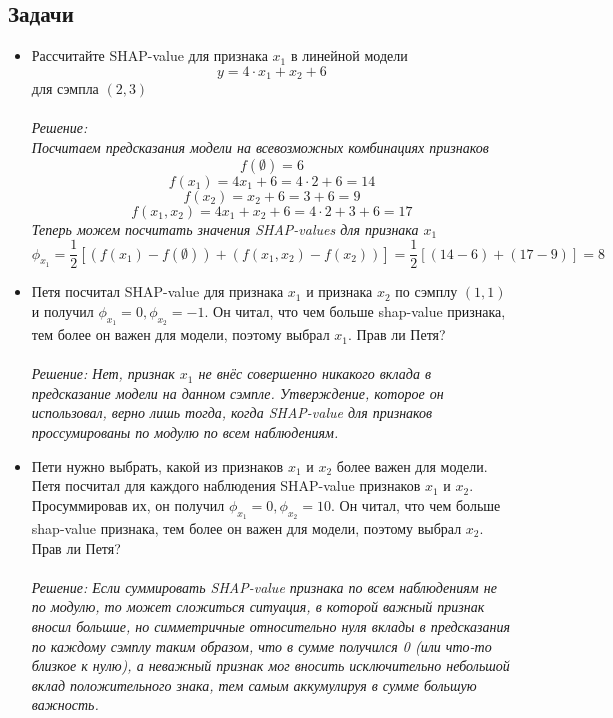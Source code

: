 \subsection*{Задачи}
\begin{itemize}
    \item Рассчитайте SHAP-value для признака $x_1$ в линейной модели 
    $$y = 4 \cdot x_1 + x_2 + 6$$ для сэмпла $(2, 3)$\\\\
    \textit{Решение:\\
    Посчитаем предсказания модели на всевозможных комбинациях признаков
    $$ f(\emptyset) = 6 $$  
    $$ f(x_1) = 4x_1 + 6 = 4 \cdot 2 + 6 = 14 $$
    $$ f(x_2) = x_2 + 6 = 3 + 6 = 9 $$
    $$ f(x_1, x_2) = 4x_1 + x_2 + 6 = 4 \cdot 2 + 3 + 6 = 17 $$
    Теперь можем посчитать значения SHAP-values для признака $x_1$
    $$
    \phi_{x_1} = \frac{1}{2} \left[ (f(x_1) - f(\emptyset)) + (f(x_1, x_2) - f(x_2)) \right] = \frac{1}{2} \left[ (14 - 6) + (17 - 9)\right] = \boxed{8}
    $$}

    \item Петя посчитал SHAP-value для признака $x_1$ и признака $x_2$ по сэмплу $(1, 1)$ и получил $\phi_{x_1} = 0, \phi_{x_2} = -1$. Он читал, что чем больше shap-value признака, тем более он важен для модели, поэтому выбрал $x_1$. Прав ли Петя?\\\\
    \textit{Решение: Нет, признак $x_1$ не внёс совершенно никакого вклада в предсказание модели на данном сэмпле. Утверждение, которое он использовал, верно лишь тогда, когда SHAP-value для признаков проссумированы по модулю по всем наблюдениям.}
    
    \item Пети нужно выбрать, какой из признаков $x_1$ и $x_2$ более важен для модели. Петя посчитал для каждого наблюдения SHAP-value признаков $x_1$ и $x_2$. Просуммировав их, он получил $\phi_{x_1} = 0, \phi_{x_2} = 10$. Он читал, что чем больше shap-value признака, тем более он важен для модели, поэтому выбрал $x_2$. Прав ли Петя?\\\\
    \textit{Решение: Если суммировать SHAP-value признака по всем наблюдениям не по модулю, то может сложиться ситуация, в которой важный признак вносил большие, но симметричные относительно нуля вклады в предсказания по каждому сэмплу таким образом, что в сумме получился 0 (или что-то близкое к нулю), а неважный признак мог вносить исключительно небольшой вклад положительного знака, тем самым аккумулируя в сумме большую важность.} 
\end{itemize}
